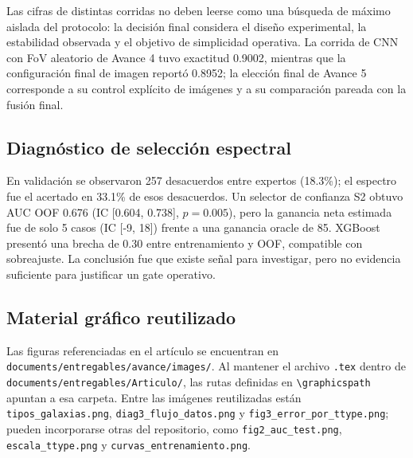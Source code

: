 \documentclass[letterpaper,11pt]{article}
\begin{document}
Las cifras de distintas corridas no deben leerse como una búsqueda de máximo aislada del protocolo: la decisión final considera el diseño experimental, la estabilidad observada y el objetivo de simplicidad operativa. La corrida de CNN con FoV aleatorio de Avance 4 tuvo exactitud 0.9002, mientras que la configuración final de imagen reportó 0.8952; la elección final de Avance 5 corresponde a su control explícito de imágenes y a su comparación pareada con la fusión final.

\subsection{Diagnóstico de selección espectral}

En validación se observaron 257 desacuerdos entre expertos (18.3\%); el espectro fue el acertado en 33.1\% de esos desacuerdos. Un selector de confianza S2 obtuvo AUC OOF 0.676 (IC [0.604, 0.738], $p=0.005$), pero la ganancia neta estimada fue de solo 5 casos (IC [-9, 18]) frente a una ganancia oracle de 85. XGBoost presentó una brecha de 0.30 entre entrenamiento y OOF, compatible con sobreajuste. La conclusión fue que existe señal para investigar, pero no evidencia suficiente para justificar un gate operativo.

\subsection{Material gráfico reutilizado}

Las figuras referenciadas en el artículo se encuentran en \texttt{documents/entregables/avance/images/}. Al mantener el archivo \texttt{.tex} dentro de \texttt{documents/entregables/Articulo/}, las rutas definidas en \texttt{\textbackslash graphicspath} apuntan a esa carpeta. Entre las imágenes reutilizadas están \texttt{tipos\_galaxias.png}, \texttt{diag3\_flujo\_datos.png} y \texttt{fig3\_error\_por\_ttype.png}; pueden incorporarse otras del repositorio, como \texttt{fig2\_auc\_test.png}, \texttt{escala\_ttype.png} y \texttt{curvas\_entrenamiento.png}.
\end{document}
